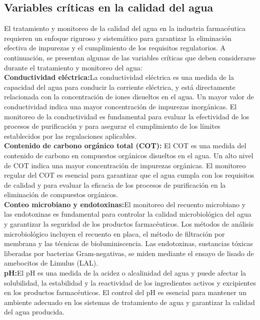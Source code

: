 \subsection{Variables críticas en la calidad del agua}

El tratamiento y monitoreo de la calidad del agua en la industria farmacéutica requieren un enfoque riguroso y sistemático para garantizar la eliminación efectiva de impurezas y el cumplimiento de los requisitos regulatorios. A continuación, se presentan algunas de las variables críticas que deben considerarse durante el tratamiento y monitoreo del agua:\\
\textbf{Conductividad eléctrica:}La conductividad eléctrica es una medida de la capacidad del agua para conducir la corriente eléctrica, y está directamente relacionada con la concentración de iones disueltos en el agua. Un mayor valor de conductividad indica una mayor concentración de impurezas inorgánicas. El monitoreo de la conductividad es fundamental para evaluar la efectividad de los procesos de purificación y para asegurar el cumplimiento de los límites establecidos por las regulaciones aplicables.\\

\textbf{Contenido de carbono orgánico total (COT):} El COT es una medida del contenido de carbono en compuestos orgánicos disueltos en el agua. Un alto nivel de COT indica una mayor concentración de impurezas orgánicas. El monitoreo regular del COT es esencial para garantizar que el agua cumpla con los requisitos de calidad y para evaluar la eficacia de los procesos de purificación en la eliminación de compuestos orgánicos.\\

\textbf{Conteo microbiano y endotoxinas:}El monitoreo del recuento microbiano y las endotoxinas es fundamental para controlar la calidad microbiológica del agua y garantizar la seguridad de los productos farmacéuticos. Los métodos de análisis microbiológico incluyen el recuento en placa, el método de filtración por membrana y las técnicas de bioluminiscencia. Las endotoxinas, sustancias tóxicas liberadas por bacterias Gram-negativas, se miden mediante el ensayo de lisado de amebocitos de Limulus (LAL).\\

\textbf{pH:}El pH es una medida de la acidez o alcalinidad del agua y puede afectar la solubilidad, la estabilidad y la reactividad de los ingredientes activos y excipientes en los productos farmacéuticos. El control del pH es esencial para mantener un ambiente adecuado en los sistemas de tratamiento de agua y garantizar la calidad del agua producida.\\


